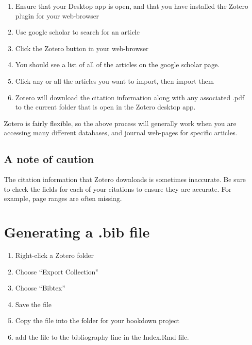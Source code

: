 \documentclass[]{book}
\providecommand{\tightlist}{%
  \setlength{\itemsep}{0pt}\setlength{\parskip}{0pt}}
\theoremstyle{definition}
\theoremstyle{definition}
\theoremstyle{definition}
\theoremstyle{remark}
\begin{document}
\begin{enumerate}
\def\labelenumi{\arabic{enumi}.}
\tightlist
\item
  Ensure that your Desktop app is open, and that you have installed the
  Zotero plugin for your web-browser
\item
  Use google scholar to search for an article
\item
  Click the Zotero button in your web-browser
\item
  You should see a list of all of the articles on the google scholar
  page.
\item
  Click any or all the articles you want to import, then import them
\item
  Zotero will download the citation information along with any
  associated .pdf to the current folder that is open in the Zotero
  desktop app.
\end{enumerate}

Zotero is fairly flexible, so the above process will generally work when
you are accessing many different databases, and journal web-pages for
specific articles.

\subsection{A note of caution}\label{a-note-of-caution}

The citation information that Zotero downloads is sometimes inaccurate.
Be sure to check the fields for each of your citations to ensure they
are accurate. For example, page ranges are often missing.

\section{Generating a .bib file}\label{generating-a-.bib-file}

\begin{enumerate}
\def\labelenumi{\arabic{enumi}.}
\tightlist
\item
  Right-click a Zotero folder
\item
  Choose ``Export Collection''
\item
  Choose ``Bibtex''
\item
  Save the file
\item
  Copy the file into the folder for your bookdown project
\item
  add the file to the bibliography line in the Index.Rmd file.
\end{enumerate}
\end{document}
